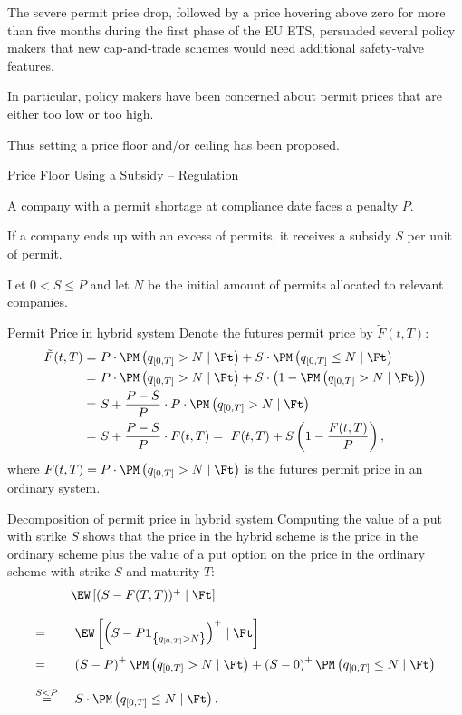 	The severe permit price drop, followed by a price hovering above zero for more than five months during the first phase of the EU ETS, persuaded several policy makers that new cap-and-trade schemes would need additional safety-valve features.


	In particular, policy makers have been concerned about permit prices that are either too low or too high.


	Thus setting a price floor and/or ceiling has been proposed.





{Price Floor Using a Subsidy -- Regulation}






	A company with a permit shortage at compliance date faces a penalty $P$.


	If a company ends up with an excess of permits, it receives a subsidy $S$ per unit of permit.


	Let $0<S\leq P$ and let $N$ be the initial amount of permits allocated to relevant companies.





{Permit Price in hybrid system}
Denote the futures permit price by $\tilde{F}(t,T)$:
\begin{align*}
\tilde{F}(t,T) =& \ P \cdot \PM \left( q_{[0,T]} > N \mid \Ft \right) + S \cdot \PM \left( q_{[0,T]} \le N \mid \Ft \right) \\
  =& \ P \cdot \PM \left( q_{[0,T]} > N \mid \Ft \right) + S \cdot \left( 1 - \PM \left( q_{[0,T]} > N \mid \Ft \right)\right) \\
  =& \ S + \frac{P-S}{P} \cdot P \cdot \PM \left( q_{[0,T]} > N \mid \Ft \right) \\
  =& \ S + \frac{P-S}{P} \cdot F(t,T) = \ F(t,T) + S\left(1 - \frac{F(t,T)}{P}\right),
\end{align*}
where $F(t,T) = P \cdot \PM \left( q_{[0,T]} > N \mid \Ft \right)$ is the futures permit price in an ordinary system.

{Decomposition of permit price in hybrid system}
Computing the value of a put with strike $S$ shows that the price in the hybrid scheme is the price in the ordinary scheme plus the value of a put option on the price in the ordinary scheme with strike $S$ and maturity $T$:
$$
\begin{array}{ll}
&\EW\left[ (S-F(T,T))^+ \mid \Ft \right]\\*[12pt]
=& \ \EW\left[ \left( S- P \textbf{1}_{\left\{ q_{[0,T]} > N \right\}} \right)^+ \mid \Ft \right] \\*[12pt]
=& \ \left( S- P \right)^+ \PM \left( q_{[0,T]} > N \mid \Ft \right) + \left( S- 0 \right)^+ \PM \left( q_{[0,T]} \le N \mid \Ft \right) \\*[12pt]
 \stackrel{S<P}{=}& \ S \cdot \PM \left( q_{[0,T]} \le N \mid \Ft \right).
\end{array}
$$

